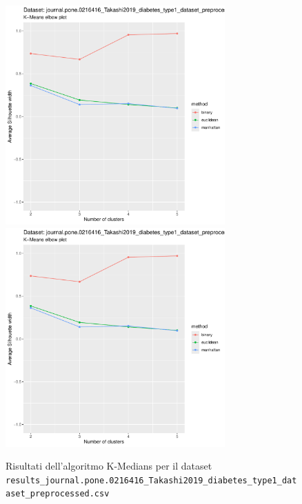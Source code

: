 \documentclass[12pt]{report}
\begin{document}
			\begin{figure}[h]
				\centering
				\includegraphics[width = 0.75\textwidth, height = 0.45\textheight, page = 3]{
					results/results_journal.pone.0216416_Takashi2019_diabetes_type1_dataset_preprocessed.csv.pdf
				}
				\includegraphics[width = 0.75\textwidth, height = 0.45\textheight, page = 4]{
					results/results_journal.pone.0216416_Takashi2019_diabetes_type1_dataset_preprocessed.csv.pdf
				}
				\caption{Risultati dell'algoritmo K-Medians per il dataset
				\texttt{results\_journal.pone.0216416\_Takashi2019\_diabetes\_type1\_dataset\_preprocessed.csv}}
				\label{fig:kmedians4}
			\end{figure}
\end{document}
